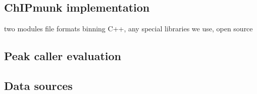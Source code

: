 \documentclass[12pt]{article}
\begin{document}
\subsection*{ChIPmunk implementation}

two modules
file formats
binning
C++, any special libraries we use, open source

\subsection*{Peak caller evaluation}



\subsection*{Data sources}
\end{document}
